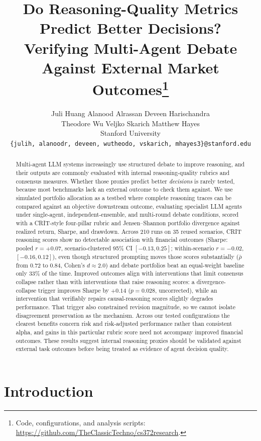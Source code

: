 \documentclass{article}
\title{Do Reasoning-Quality Metrics Predict Better Decisions?\\
Verifying Multi-Agent Debate Against External Market Outcomes\thanks{Code, configurations, and analysis scripts: \url{https://github.com/TheClassicTechno/cs372research}.}}
\author{%
  Juli Huang \quad Alanood Alrassan \quad Deveen Harischandra \\
  Theodore Wu \quad Veljko Skarich \quad Matthew Hayes \\
  Stanford University \\
  \texttt{\{julih, alanoodr, deveen, wutheodo, vskarich, mhayes3\}@stanford.edu}
}
\begin{document}
\maketitle
\vspace{-0.5cm}
\begin{abstract}
Multi-agent LLM systems increasingly use structured debate to improve reasoning, and
their outputs are commonly evaluated with internal reasoning-quality rubrics and
consensus measures. Whether those proxies predict better \emph{decisions} is rarely
tested, because most benchmarks lack an external outcome to check them against. We
use simulated portfolio allocation as a testbed where complete reasoning traces can
be compared against an objective downstream outcome, evaluating specialist LLM agents
under single-agent, independent-ensemble, and multi-round debate conditions, scored
with a CRIT-style four-pillar rubric and Jensen--Shannon portfolio divergence against
realized return, Sharpe, and drawdown. Across 210 runs on 35 reused scenarios, CRIT reasoning scores show
no detectable association with financial outcomes (Sharpe: pooled $r{=}{+}0.07$, scenario-clustered 95\% CI $[-0.13,0.25]$; within-scenario $r{=}{-}0.02$, $[-0.16,0.12]$), even though structured prompting
moves those scores substantially ($\bar{\rho}$ from $0.72$ to $0.84$, Cohen's
$d{\approx}2.0$) and debate portfolios beat an equal-weight baseline only 33\% of the
time. Improved outcomes align with interventions that limit consensus collapse rather than with interventions that raise reasoning scores: a divergence-collapse trigger improves Sharpe by $+0.14$ ($p{=}0.028$, uncorrected), while an intervention that verifiably repairs causal-reasoning scores slightly degrades performance. That trigger also constrained revision magnitude, so we cannot isolate disagreement preservation as the mechanism. Across our tested configurations the clearest benefits concern risk and risk-adjusted performance rather than consistent alpha, and gains in this particular rubric score need not accompany improved financial outcomes. These results suggest internal reasoning proxies should be
validated against external task outcomes before being treated as evidence of agent
decision quality.
\end{abstract}
\vspace{-0.35cm}
\vspace{-0.35cm}
\section{Introduction}
\vspace{-6pt}
\end{document}
